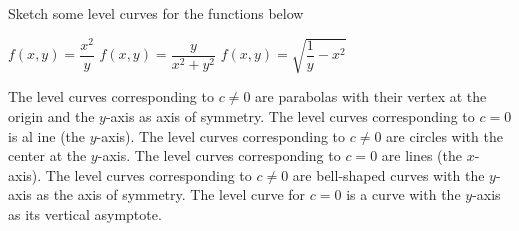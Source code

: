 \begin{Exercise} Sketch some level curves for the functions below
\begin{multicols}{2}
		\Question[difficulty=1] $f(x,y)=\dfrac{x^2}{y}$ 
		\ifanalysis\Question[difficulty=2]\fi\ifcalculus\Question[difficulty=3]\fi $f(x,y) = \dfrac{y}{x^2+y^2}$ 
		\Question[difficulty=2] $f(x,y)=\sqrt{\dfrac{1}{y}-x^2}$ 
        \EndCurrentQuestion
\end{multicols}
\end{Exercise}

\begin{Answer}
    
        \Question The level curves corresponding to $c \neq 0$ are parabolas with their vertex at the origin and the $y$-axis as axis of symmetry. The level curves corresponding to $c=0$ is  al ine (the $y$-axis). 
        \Question The level curves corresponding to $c \neq 0$ are circles with the center at the $y$-axis. The level curves corresponding to $c=0$ are lines (the $x$-axis). 
        \Question The level curves corresponding to $c \neq 0$ are bell-shaped curves with the $y$-axis as the axis of symmetry. The level curve for $c=0$ is a curve with the $y$-axis as its vertical asymptote. 
\end{Answer}


